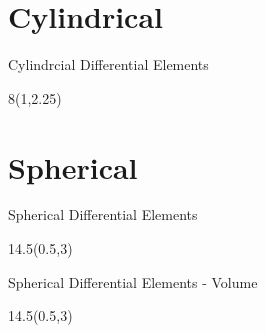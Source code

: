 \section{Cylindrical}

\begin{frame}{Cylindrcial Differential Elements}
\begin{textblock}{8}(1,2.25)
 \begin{center}
 \scalebox{0.8}{
  
    } %
  \end{center}
\end{textblock}
\end{frame}


\section{Spherical}
\begin{frame}{Spherical Differential Elements}
\begin{textblock}{14.5}(0.5,3)

  

\end{textblock}
\end{frame}



\begin{frame}{Spherical Differential Elements - Volume}
\begin{textblock}{14.5}(0.5,3)

  

\end{textblock}
\end{frame}




